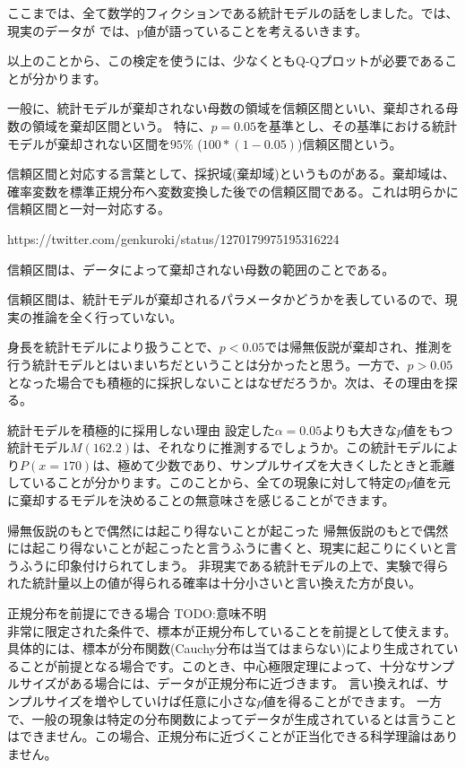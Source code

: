 ここまでは、全て数学的フィクションである統計モデルの話をしました。では、現実のデータが
では、p値が語っていることを考えるいきます。


以上のことから、この検定を使うには、少なくともQ-Qプロットが必要であることが分かります。


一般に、統計モデルが棄却されない母数の領域を信頼区間といい、棄却される母数の領域を棄却区間という。
特に、$p=0.05$を基準とし、その基準における統計モデルが棄却されない区間を$95\%$ ($100*(1-0.05)$)信頼区間という。


信頼区間と対応する言葉として、採択域(棄却域)というものがある。棄却域は、確率変数を標準正規分布へ変数変換した後での信頼区間である。これは明らかに信頼区間と一対一対応する。

https://twitter.com/genkuroki/status/1270179975195316224


信頼区間は、データによって棄却されない母数の範囲のことである。

信頼区間は、統計モデルが棄却されるパラメータかどうかを表しているので、現実の推論を全く行っていない。

身長を統計モデルにより扱うことで、$p<0.05$では帰無仮説が棄却され、推測を行う統計モデルとはいまいちだということは分かったと思う。一方で、$p>0.05$となった場合でも積極的に採択しないことはなぜだろうか。次は、その理由を探る。
\fi



\begin{SMbox}{統計モデルを積極的に採用しない理由}
設定した$\alpha=0.05$よりも大きな$p$値をもつ統計モデル$M(162.2)$は、それなりに推測するでしょうか。この統計モデルにより$P(x=170)$は、極めて少数であり、サンプルサイズを大きくしたときと乖離していることが分かります。このことから、全ての現象に対して特定の$p$値を元に棄却するモデルを決めることの無意味さを感じることができます。
\end{SMbox}
\fi


\begin{SMbox}{帰無仮説のもとで偶然には起こり得ないことが起こった}
    帰無仮説のもとで偶然には起こり得ないことが起こったと言うふうに書くと、現実に起こりにくいと言うふうに印象付けられてしまう。
    非現実である統計モデルの上で、実験で得られた統計量以上の値が得られる確率は十分小さいと言い換えた方が良い。
\end{SMbox}
\fi


\begin{SMbox}{正規分布を前提にできる場合}
TODO:意味不明\\
非常に限定された条件で、標本が正規分布していることを前提として使えます。具体的には、標本が分布関数(Cauchy分布は当てはまらない)により生成されていることが前提となる場合です。このとき、中心極限定理によって、十分なサンプルサイズがある場合には、データが正規分布に近づきます。
言い換えれば、サンプルサイズを増やしていけば任意に小さな$p$値を得ることができます。
一方で、一般の現象は特定の分布関数によってデータが生成されているとは言うことはできません。この場合、正規分布に近づくことが正当化できる科学理論はありません。     
\end{SMbox}
\fi


